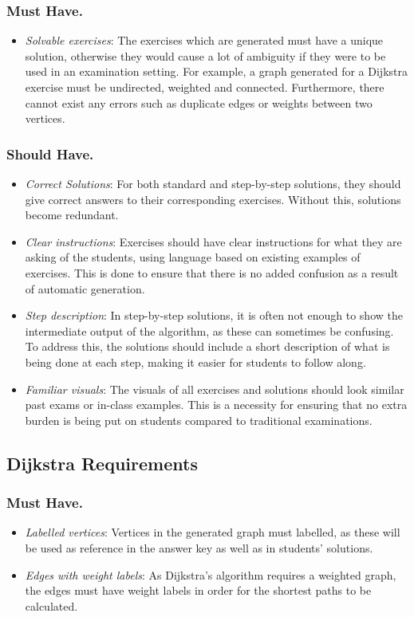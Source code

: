 \documentclass{l4proj}
\begin{document}
\subsubsection{Must Have.}
\begin{itemize}
	\item
	\emph{Solvable exercises}: The exercises which are generated must have a unique solution, otherwise they would cause a lot of ambiguity if they were to be used in an examination setting. For example, a graph generated for a Dijkstra exercise must be undirected, weighted and connected. Furthermore, there cannot exist any errors such as duplicate edges or weights between two vertices.
\end{itemize}
\subsubsection{Should Have.}
\begin{itemize}
	\item
	\emph{Correct Solutions}: For both standard and step-by-step solutions, they should give correct answers to their corresponding exercises. Without this, solutions become redundant.
	\item
	\emph{Clear instructions}: Exercises should have clear instructions for what they are asking of the students, using language based on existing examples of exercises. This is done to ensure that there is no added confusion as a result of automatic generation.
	\item
	\emph{Step description}: In step-by-step solutions, it is often not enough to show the intermediate output of the algorithm, as these can sometimes be confusing. To address this, the solutions should include a short description of what is being done at each step, making it easier for students to follow along. 
	\item
	\emph{Familiar visuals}: The visuals of all exercises and solutions should look similar past exams or in-class examples. This is a necessity for ensuring that no extra burden is being put on students compared to traditional examinations. 
\end{itemize}
\subsection{Dijkstra Requirements}
\label{sec:dijkr}
\subsubsection{Must Have.}
\begin{itemize}
	\item
	\emph{Labelled vertices}: Vertices in the generated graph must labelled, as these will be used as reference in the answer key as well as in students' solutions. 
	\item
	\emph{Edges with weight labels}: As Dijkstra's algorithm requires a weighted graph, the edges must have weight labels in order for the shortest paths to be calculated.
\end{itemize}
\end{document}
